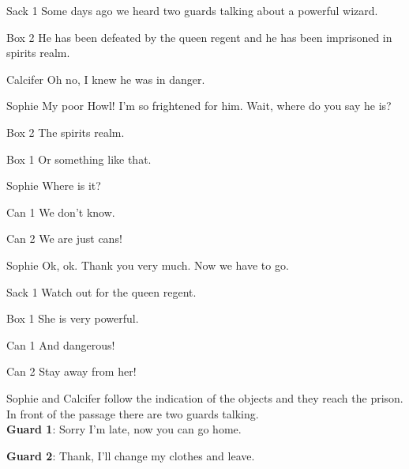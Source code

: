\begin{screenplay}
\begin{dialogue}{Sack 1}
Some days ago we heard two guards talking about a powerful wizard.
\end{dialogue}
\begin{dialogue}{Box 2}
He has been defeated by the queen regent and he has been imprisoned in spirits realm.
\end{dialogue}
\begin{dialogue}{Calcifer}
Oh no, I knew he was in danger.
\end{dialogue}
\begin{dialogue}{Sophie}
My poor Howl! I’m so frightened for him. Wait, where do you say he is?
\end{dialogue}
\begin{dialogue}{Box 2}
The spirits realm.
\end{dialogue}
\begin{dialogue}{Box 1}
Or something like that.
\end{dialogue}
\begin{dialogue}{Sophie}
Where is it?
\end{dialogue}
\begin{dialogue}{Can 1}
We don’t know.
\end{dialogue}
\begin{dialogue}{Can 2}
We are just cans!
\end{dialogue}
\begin{dialogue}{Sophie}
Ok, ok. Thank you very much. Now we have to go.
\end{dialogue}
\begin{dialogue}{Sack 1}
Watch out for the queen regent.
\end{dialogue}
\begin{dialogue}{Box 1}
She is very powerful.
\end{dialogue}
\begin{dialogue}{Can 1}
And dangerous!
\end{dialogue}
\begin{dialogue}{Can 2}
Stay away from her!
\end{dialogue}
\end{screenplay}

\noindent Sophie and Calcifer follow the indication of the objects and they reach the prison. In front of the passage there are two guards talking.\\

\textbf{Guard 1}: Sorry I’m late, now you can go home.

\textbf{Guard 2}: Thank, I’ll change my clothes and leave.\\


